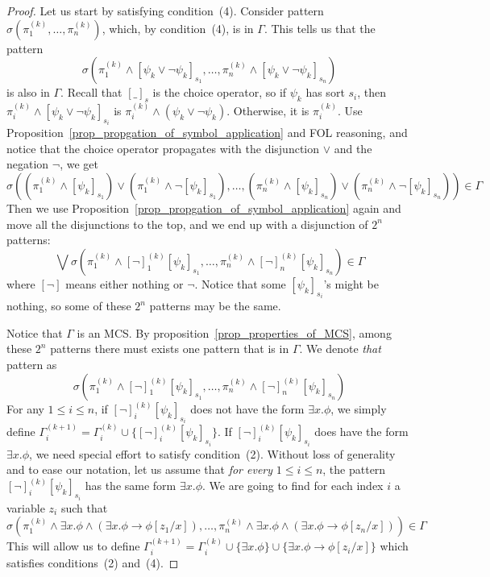 \documentclass[acmsmall]{acmart}
\theoremstyle{acmdefinition}
\newcommand{\imp}{\to}
\newcommand{\Gammai}[1]{\Gamma_i^{(#1)}}
\newcommand{\pii}[1]{\pi_i^{(#1)}}
\newcommand{\ddd}{,\dots,}
\begin{document}
\begin{proof}
Let us start by satisfying condition~(4).
Consider pattern
$\sigma(\pi_1^{(k)} \ddd \pi_n^{(k)})$,
which, by condition~(4), is in $\Gamma$.
This tells us that the pattern
$$
\sigma(
\pi_1^{(k)} \wedge [\psi_k \vee \neg \psi_k]_{s_1}
\ddd 
\pi_n^{(k)} \wedge [\psi_k \vee \neg \psi_k]_{s_n}
)
$$
is also in $\Gamma$.
Recall that $[\_]_s$ is the choice operator,
so if $\psi_k$ has sort $s_i$, then
$\pii{k} \wedge [\psi_k \vee \neg \psi_k]_{s_i}$
is $\pii{k} \wedge (\psi_k \vee \neg \psi_k) $.
Otherwise,
it is $\pii{k}$.
Use Proposition~\ref{prop_propgation_of_symbol_application}
and FOL reasoning, and notice that the choice operator propagates
with the disjunction $\vee$ and the negation $\neg$,
we get
$$\sigma(
(\pi_1^{(k)} \wedge [\psi_k]_{s_1}) 
\vee 
(\pi_1^{(k)} \wedge \neg [\psi_k]_{s_1})
\ddd 
(\pi_n^{(k)} \wedge [\psi_k]_{s_n}) 
\vee 
(\pi_n^{(k)} \wedge \neg [\psi_k]_{s_n})
) \in \Gamma $$
Then we use Proposition~\ref{prop_propgation_of_symbol_application} again
and move all the disjunctions to the top, 
and we end up with a disjunction of
$2^n$ patterns:
$$\bigvee
  \sigma(
  \pi_1^{(k)} \wedge [\neg]_1^{(k)} [\psi_k]_{s_1} \ddd
  \pi_n^{(k)} \wedge [\neg]_n^{(k)} [\psi_k]_{s_n}
) \in \Gamma
$$
where $[\neg]$ means either nothing or $\neg$.
Notice that some $[\psi_k]_{s_i}$'s might be nothing, 
so some of these $2^n$ patterns may be the same.

Notice that $\Gamma$ is an MCS.
By proposition~\ref{prop_properties_of_MCS}, among these $2^n$ patterns
there must exists one pattern that is in $\Gamma$.
We denote \emph{that} pattern as
$$
\sigma(
\pi_1^{(k)} \wedge [\neg]_1^{(k)} [\psi_k]_{s_1} \ddd
\pi_n^{(k)} \wedge [\neg]_n^{(k)} [\psi_k]_{s_n}
)
$$
For any $1 \le i \le n$,
if $[\neg]_i^{(k)} [\psi_k]_{s_i}$
does not have the form $\exists x . \phi$,
we simply define 
$\Gammai{k+1} = \Gammai{k} \cup \{ [\neg]_i^{(k)} [\psi_k]_{s_i} \}$.
If $[\neg]_i^{(k)} [\psi_k]_{s_i}$
does have the form $\exists x . \phi$,
we need special effort to satisfy condition~(2).
Without loss of generality
and to ease our notation,
let us assume that \emph{for every} $1 \le i \le n$,
the pattern $[\neg]_i^{(k)} [\psi_k]_{s_i}$ has the same form
$\exists x . \phi$.
We are going to find for each index $i$ a variable $z_i$
such that
$$
\sigma(
\pi_1^{(k)} \wedge  \exists x . \phi 
            \wedge (\exists x . \phi \imp \phi[z_1/x]) \ddd
\pi_n^{(k)} \wedge  \exists x . \phi
            \wedge (\exists x . \phi \imp \phi[z_n/x])
) \in \Gamma
$$
This will allow us to define
$\Gammai{k+1} = \Gammai{k} 
    \cup \{ \exists x . \phi \}
    \cup \{ \exists x . \phi \imp \phi[z_i/x] \}
$
which satisfies conditions~(2) and~(4).


\end{proof}
\end{document}
